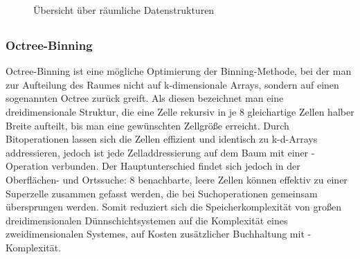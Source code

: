 \begin{figure}[bhpt]
  \caption[Übersicht über räumliche Datenstrukturen]{Übersicht über räumliche Datenstrukturen}
  \label{fig:datastructures}
\end{figure}

\subsection{}

\subsubsection{Octree-Binning}
Octree-Binning ist eine mögliche Optimierung der Binning-Methode, bei der man zur Aufteilung des Raumes nicht auf k-dimensionale Arrays, sondern auf einen sogenannten Octree zurück greift.
Als diesen bezeichnet man eine dreidimensionale Struktur, die eine Zelle rekursiv in je 8 gleichartige Zellen halber Breite aufteilt, bis man eine gewünschten Zellgröße erreicht.
Durch Bitoperationen lassen sich die Zellen effizient und identisch zu k-d-Arrays addressieren, jedoch ist jede Zelladdressierung auf dem Baum mit einer -Operation verbunden.
Der Hauptunterschied findet sich jedoch in der Oberflächen- und Ortssuche:
8 benachbarte, leere Zellen können effektiv zu einer Superzelle zusammen gefasst werden, die bei Suchoperationen gemeinsam übersprungen werden.
Somit reduziert sich die Speicherkomplexität von großen dreidimensionalen Dünnschichtsystemen auf die Komplexität eines zweidimensionalen Systemes, auf Kosten zusätzlicher Buchhaltung mit -Komplexität.

